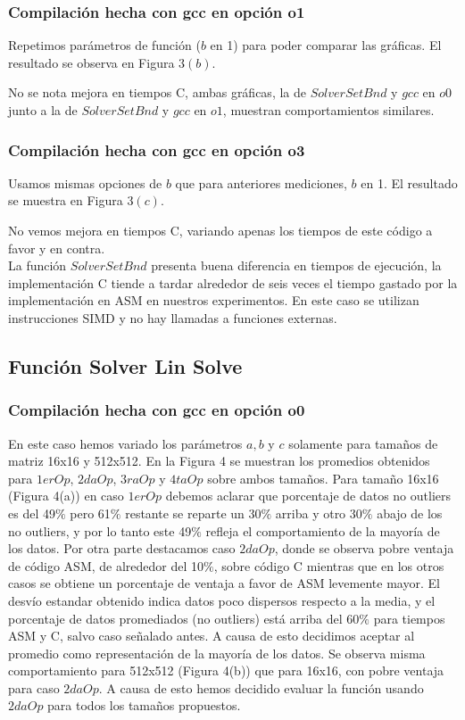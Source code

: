 \subsubsection{Compilación hecha con gcc en opción o1}
Repetimos parámetros de función ($b$ en 1) para poder comparar las gráficas. El resultado se observa en Figura 3$(b)$.
 
No se nota mejora en tiempos C, ambas gráficas, la de $Solver Set Bnd$ y $gcc$ en $o0$ junto a la de $Solver Set Bnd$ y $gcc$ en $o1$, muestran comportamientos similares.

\subsubsection{Compilación hecha con gcc en opción o3}
Usamos mismas opciones de $b$ que para anteriores mediciones, $b$ en 1. El resultado se muestra en Figura 3$(c)$.
 
No vemos mejora en tiempos C, variando apenas los tiempos de este código a favor y en contra. 
\\

La función $Solver Set Bnd$ presenta buena diferencia en tiempos de ejecución, la implementación C tiende a tardar alrededor de seis veces el tiempo gastado por la implementación en ASM en nuestros experimentos. En este caso se utilizan instrucciones SIMD y no hay llamadas a funciones  externas.

 
\subsection{Función Solver Lin Solve}

\subsubsection{Compilación hecha con gcc en opción o0}
En este caso hemos variado los parámetros $a,b$ y $c$ solamente para tamaños de matriz 16x16 y 512x512. En la Figura 4 se muestran los promedios obtenidos para $1erOp$, $2daOp$, $3raOp$ y $4taOp$ sobre ambos tamaños. 
Para tamaño 16x16 (Figura 4(a)) en caso $1erOp$ debemos aclarar que porcentaje de datos no outliers es del 49$\%$ pero 61$\%$ restante se reparte un 30$\%$ arriba y otro 30$\%$ abajo de los no outliers, y por lo tanto este 49$\%$ refleja el comportamiento de la mayoría de los datos. Por otra parte destacamos caso $2daOp$, donde se observa pobre ventaja de código ASM, de alrededor del 10$\%$, sobre código C mientras que en los otros casos se obtiene un porcentaje de ventaja a favor de ASM levemente mayor. El desvío estandar obtenido indica datos poco dispersos respecto a la media, y el porcentaje de datos promediados (no outliers) está arriba del 60$\%$ para tiempos ASM y C, salvo caso señalado antes. A causa de esto decidimos aceptar al promedio como representación de la mayoría de los datos. Se observa misma comportamiento para 512x512 (Figura 4(b)) que para 16x16, con pobre ventaja para caso $2daOp$. A causa de esto hemos decidido evaluar la función usando $2daOp$ para todos los tamaños propuestos.
 
